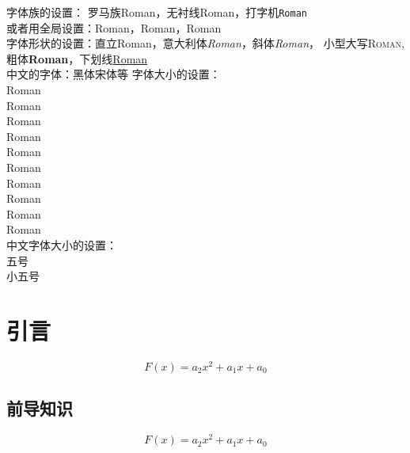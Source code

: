 \documentclass[UTF8,a4paper]{article}
\begin{document}
    \selectfont
	\linespread{1.5}%
	字体族的设置：
	罗马族\textrm{Roman}，无衬线\textsf{Roman}，打字机\texttt{Roman} \\
	或者用全局设置：{\rmfamily Roman}，{\sffamily Roman}，{\ttfamily Roman} \\%
	字体形状的设置：直立\textup{Roman}，意大利体\textit{Roman}，斜体\textsl{Roman}，
	小型大写\textsc{Roman},粗体\textbf{Roman}，下划线\underline{Roman} \\%
	中文的字体：{\heiti 黑体}{\songti 宋体}等
	字体大小的设置：\\%
	{\tiny Roman \\
	\scriptsize Roman \\ 
	\footnotesize Roman  \\
	\small Roman  \\
	\normalsize Roman  \\ %
	\large Roman \\
	\Large Roman \\
	\LARGE Roman \\
	\huge Roman \\
	\Huge Roman \\}
	中文字体大小的设置：\\ 五号 \\  小五号\\
	
	
	\section{引言}
	
	\begin{equation}
	F(x)=a_2x^2+a_1x+a_0 
	\end{equation}
	
	\subsection{前导知识}
	
	\begin{equation}
	F(x)=a_2x^2+a_1x+a_0 
	\end{equation}
	
\end{document}
